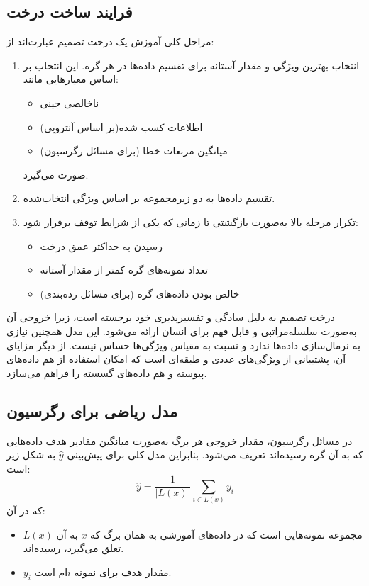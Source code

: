 \subsection*{فرایند ساخت درخت}

مراحل کلی آموزش یک درخت تصمیم عبارت‌اند از:

\begin{enumerate}
	\item انتخاب بهترین ویژگی و مقدار آستانه برای تقسیم داده‌ها در هر گره. این انتخاب بر اساس معیارهایی مانند:
	\begin{itemize}
		\item ناخالصی جینی
		\item اطلاعات کسب شده(بر اساس آنتروپی)
		\item میانگین مربعات خطا (برای مسائل رگرسیون)
	\end{itemize}
	صورت می‌گیرد.
	\item تقسیم داده‌ها به دو زیرمجموعه بر اساس ویژگی انتخاب‌شده.
	\item تکرار مرحله بالا به‌صورت بازگشتی تا زمانی که یکی از شرایط توقف برقرار شود:
	\begin{itemize}
		\item رسیدن به حداکثر عمق درخت
		\item تعداد نمونه‌های گره کمتر از مقدار آستانه
		\item خالص بودن داده‌های گره (برای مسائل رده‌بندی)
	\end{itemize}
\end{enumerate}

درخت تصمیم به دلیل سادگی و تفسیرپذیری خود برجسته است، زیرا خروجی آن به‌صورت سلسله‌مراتبی و قابل فهم برای انسان ارائه می‌شود. این مدل همچنین نیازی به نرمال‌سازی داده‌ها ندارد و نسبت به مقیاس ویژگی‌ها حساس نیست. از دیگر مزایای آن، پشتیبانی از ویژگی‌های عددی و طبقه‌ای است که امکان استفاده از هم داده‌های پیوسته و هم داده‌های گسسته را فراهم می‌سازد.

\subsection*{مدل ریاضی برای رگرسیون}

در مسائل رگرسیون، مقدار خروجی هر برگ به‌صورت میانگین مقادیر هدف داده‌هایی که به آن گره رسیده‌اند تعریف می‌شود. بنابراین مدل کلی برای پیش‌بینی $\hat{y}$ به شکل زیر است:
\[
\hat{y} = \frac{1}{|L(x)|} \sum_{i \in L(x)} y_i
\]
که در آن:
\begin{itemize}
	\item $L(x)$ مجموعه نمونه‌هایی است که در داده‌های آموزشی به همان برگ که $x$ به آن تعلق می‌گیرد، رسیده‌اند.
	\item $y_i$ مقدار هدف برای نمونه $i$ام است.
\end{itemize}

